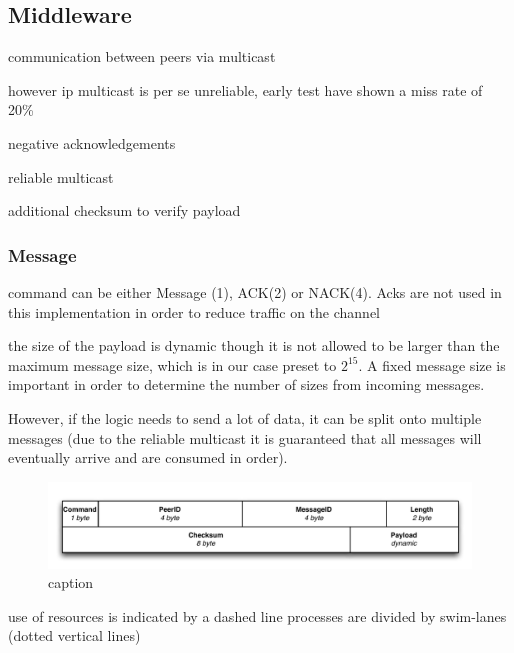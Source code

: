 


\subsection{Middleware}
communication between peers via multicast 

however ip multicast is per se unreliable, early test have shown a miss rate of 20\%

negative acknowledgements

reliable multicast

additional checksum to verify payload

\subsubsection{Message}


command can be either Message (1), ACK(2) or NACK(4). 
Acks are not used in this implementation in order to reduce traffic on the channel 

the size of the payload is dynamic though it is not allowed to be larger than the maximum message size, which is in our case preset to $2^15$. A fixed message size is important in order to determine the number of sizes from incoming messages. 


However, if the logic needs to send a lot of data, it can be split onto multiple messages (due to the reliable multicast it is guaranteed that all messages will eventually arrive and are consumed in order).



\begin{figure}[htbp]
    \centering
        \includegraphics[width=.9\textwidth]{figures/message.pdf}
    \caption{caption}
    \label{fig:figures_announcement}
\end{figure}

use of resources  is indicated by a dashed line 
processes are divided by swim-lanes (dotted vertical lines)

